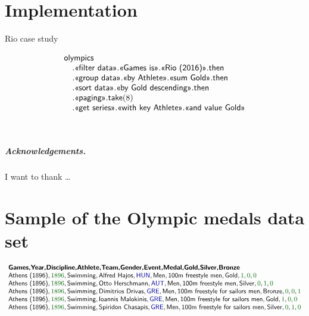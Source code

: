 \documentclass[a4paper,UKenglish]{lipics-v2016}
\theoremstyle{plain}
\theoremstyle{definition}
\newcommand{\num}[1]{\textcolor{numclr}{#1}}
\newcommand{\kvd}[1]{\textnormal{\textcolor{kvdclr}{\sffamily #1}}}
\newcommand{\ident}[1]{\textnormal{\sffamily #1}}
\newcommand{\qident}[1]{\textnormal{\sffamily \guillemotleft #1\guillemotright}}
\begin{document}

\section{Implementation}
\label{sec:impl}

Rio case study


\begin{equation*}
\begin{array}{l}
\ident{olympics}\\
\quad.\qident{filter data}.\qident{Games is}.\qident{Rio (2016)}.\ident{then}\\
\quad.\qident{group data}.\qident{by Athlete}.\qident{sum Gold}.\ident{then}\\
\quad.\qident{sort data}.\qident{by Gold descending}.\ident{then}\\
\quad.\qident{paging}.\ident{take}(8)\\
\quad.\qident{get series}.\qident{with key Athlete}.\qident{and value Gold}
\end{array}
\end{equation*}

~
\newpage

\subparagraph*{Acknowledgements.}

I want to thank \dots

\appendix
\section{Sample of the Olympic medals data set}
\label{app:olympics-csv}

{\small
\begin{equation*}
\begin{array}{l}
\textbf{\sffamily {Games},{Year},{Discipline},{Athlete},{Team},{Gender},{Event},{Medal},{Gold},{Silver},{Bronze}}\\
\ident{Athens (1896)},\num{1896},\ident{Swimming},\ident{Alfred Hajos},\kvd{HUN},\ident{Men},\ident{100m freestyle men},\ident{Gold},\num{1},\num{0},\num{0}\\
\ident{Athens (1896)},\num{1896},\ident{Swimming},\ident{Otto Herschmann},\kvd{AUT},\ident{Men},\ident{100m freestyle men},\ident{Silver},\num{0},\num{1},\num{0}\\
\ident{Athens (1896)},\num{1896},\ident{Swimming},\ident{Dimitrios Drivas},\kvd{GRE},\ident{Men},\ident{100m freestyle for sailors men},\ident{Bronze},\num{0},\num{0},\num{1}\\
\ident{Athens (1896)},\num{1896},\ident{Swimming},\ident{Ioannis Malokinis},\kvd{GRE},\ident{Men},\ident{100m freestyle for sailors men},\ident{Gold},\num{1},\num{0},\num{0}\\
\ident{Athens (1896)},\num{1896},\ident{Swimming},\ident{Spiridon Chasapis},\kvd{GRE},\ident{Men},\ident{100m freestyle for sailors men},\ident{Silver},\num{0},\num{1},\num{0}\\
\end{array}
\end{equation*} }






\end{document}
